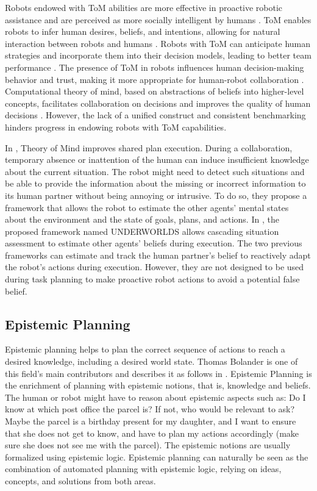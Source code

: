     Robots endowed with ToM abilities are more effective in proactive robotic assistance and are perceived as more socially intelligent by humans \cite{shvo_proactive_2022}. ToM enables robots to infer human desires, beliefs, and intentions, allowing for natural interaction between robots and humans \cite{yu_robot_2023}. Robots with ToM can anticipate human strategies and incorporate them into their decision models, leading to better team performance \cite{romeo_exploring_2022}. The presence of ToM in robots influences human decision-making behavior and trust, making it more appropriate for human-robot collaboration \cite{schlobach_abstracting_2022}. Computational theory of mind, based on abstractions of beliefs into higher-level concepts, facilitates collaboration on decisions and improves the quality of human decisions \cite{gurney_robots_2022}. However, the lack of a unified construct and consistent benchmarking hinders progress in endowing robots with ToM capabilities.

    In \cite{devin_implemented_2016}, Theory of Mind improves shared plan execution. 
    During a collaboration, temporary absence or inattention of the human can induce insufficient knowledge about the current situation. The robot might need to detect such situations and be able to provide the information about the missing or incorrect information to its human partner without being annoying or intrusive. To do so, they propose a framework that allows the robot to estimate the other agents' mental states about the environment and the state of goals, plans, and actions. 
    In \cite{lemaignan_underworlds_2018}, the proposed framework named UNDERWORLDS allows cascading situation assessment to estimate other agents' beliefs during execution. The two previous frameworks can estimate and track the human partner's belief to reactively adapt the robot's actions during execution. However, they are not designed to be used during task planning to make proactive robot actions to avoid a potential false belief.


    \subsection{Epistemic Planning}
    Epistemic planning helps to plan the correct sequence of actions to reach a desired knowledge, including a desired world state. Thomas Bolander is one of this field's main contributors and describes it as follows in \cite{bolander_gentle_2017}. Epistemic Planning is the enrichment of planning with epistemic notions, that is, knowledge and beliefs. The human or robot might have to reason about epistemic aspects such as: Do I know at which post office the parcel is? If not, who would be relevant to ask? Maybe the parcel is a birthday present for my daughter, and I want to ensure that she does not get to know, and have to plan my actions accordingly (make sure she does not see me with the parcel). The epistemic notions are usually formalized using epistemic logic. Epistemic planning can naturally be seen as the combination of automated planning with epistemic logic, relying on ideas, concepts, and solutions from both areas. 

